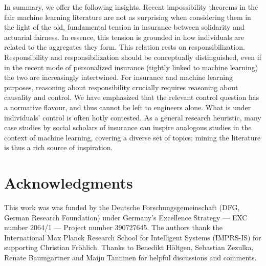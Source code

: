 \documentclass[11pt]{article} %
\begin{document}
In summary, we offer the following insights. Recent impossibility theorems in the fair machine learning literature \citep{kleinberg_et_al:LIPIcs.ITCS.2017.43} are not as surprising when considering them in the light of the old, fundamental tension in insurance between solidarity and actuarial fairness. In essence, this tension is grounded in how individuals are related to the aggregates they form. This relation rests on responsibilization. Responsibility and responsibilization should be conceptually distinguished, even if in the recent mode of personalized insurance (tightly linked to machine learning) the two are increasingly intertwined. For insurance and machine learning purposes, reasoning about responsibility crucially requires reasoning about causality and control. We have emphasized that the relevant control question has a normative flavour, and thus cannot be left to engineers alone. What is under individuals' control is often hotly contested. As a general research heuristic, many case studies by social scholars of insurance can inspire analogous studies in the context of machine learning, covering a diverse set of topics; mining the literature is thus a rich source of inspiration.





\section*{Acknowledgments}
This work was was funded by the Deutsche Forschungsgemeinschaft (DFG, German Research Foundation)
under Germany’s Excellence Strategy — EXC number 2064/1 — Project number 390727645. The authors
thank the International Max Planck Research School for Intelligent Systems (IMPRS-IS) for supporting
Christian Fröhlich. 
Thanks to Benedikt Höltgen, Sebastian Zezulka, Renate Baumgartner and Maiju Tanninen for helpful discussions and comments. 
\end{document}
